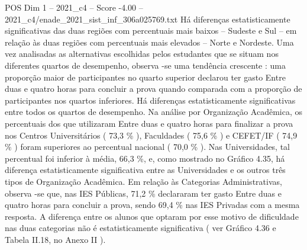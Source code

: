 \begin{textsample}{POS Dim 1 – 2021\_c4 – Score -4.00 – 2021\_c4/enade\_2021\_sist\_inf\_306a025769.txt}
Há diferenças estatisticamente significativas das duas regiões com percentuais mais baixos – Sudeste e Sul – em relação às duas regiões com percentuais mais elevados – Norte e Nordeste.
Uma vez analisadas as alternativas escolhidas pelos estudantes que se situam nos diferentes quartos de desempenho, observa -se uma tendência crescente : uma proporção maior de participantes no quarto superior declarou ter gasto Entre duas e quatro horas para concluir a prova quando comparada com a proporção de participantes nos quartos inferiores.
Há diferenças estatisticamente significativas entre todos os quartos de desempenho.
Na análise por Organização Acadêmica, os percentuais dos que utilizaram Entre duas e quatro horas para finalizar a prova nos Centros Universitários ( 73,3 \% ), Faculdades ( 75,6 \% ) e CEFET/IF ( 74,9 \% ) foram superiores ao percentual nacional ( 70,0 \% ).
Nas Universidades, tal percentual foi inferior à média, 66,3 \%, e, como mostrado no Gráfico 4.35, há diferença estatisticamente significativa entre as Universidades e os outros três tipos de Organização Acadêmica.
Em relação às Categorias Administrativas, observa -se que, nas IES Públicas, 71,2 \% declararam ter gasto Entre duas e quatro horas para concluir a prova, sendo 69,4 \% nas IES Privadas com a mesma resposta.
A diferença entre os alunos que optaram por esse motivo de dificuldade nas duas categorias não é estatisticamente significativa ( ver Gráfico 4.36 e Tabela II.18, no Anexo II ).

\end{textsample}
